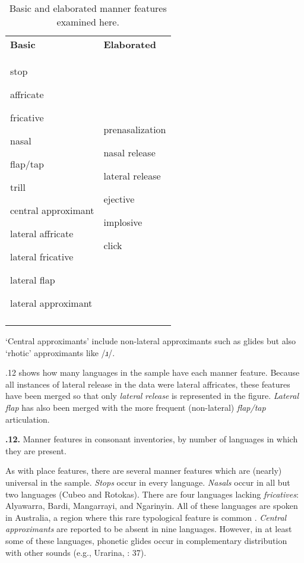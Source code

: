 \begin{table}
\begin{tabularx}{\textwidth}{XX}
\lsptoprule

\textbf{Basic} & \textbf{Elaborated}\\
stop

affricate

fricative

nasal

flap/tap

trill

central approximant

lateral affricate

lateral fricative

lateral flap

lateral approximant & prenasalization

nasal release

lateral release

ejective

implosive

click\\
\lspbottomrule
\end{tabularx}
\caption{\label{4.14}Basic and elaborated manner features examined here.}‘Central approximants’ include non-lateral approximants such as glides but also ‘rhotic’ approximants like /ɹ/.
\end{table}

  .12 shows how many languages in the sample have each manner feature. Because all instances of lateral release in the data were lateral affricates, these features have been merged so that only \textit{lateral} \textit{release} is represented in the figure. \textit{Lateral} \textit{flap} has also been merged with the more frequent (non-lateral) \textit{flap/tap} articulation.

\textbf{.12.} Manner features in consonant inventories, by number of languages in which they are present.

  As with place features, there are several manner features which are (nearly) universal in the sample. \textit{Stops} occur in every language. \textit{Nasals} occur in all but two languages (Cubeo and Rotokas). There are four languages lacking \textit{fricatives}: Alyawarra, Bardi, Mangarrayi, and Ngarinyin. All of these languages are spoken in Australia, a region where this rare typological feature is common \citep[42]{Maddieson1984}. \textit{Central} \textit{approximants} are reported to be absent in nine languages. However, in at least some of these languages, phonetic glides occur in complementary distribution with other sounds (e.g., Urarina, \citealt{Olawsky2006}: 37).

